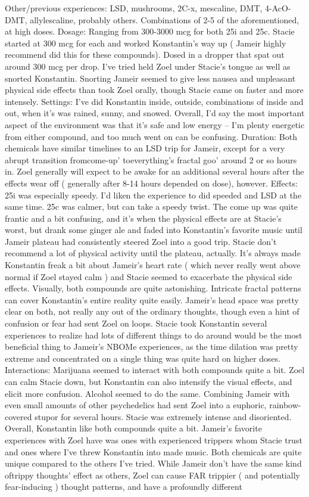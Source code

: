 \documentclass[12pt]{book}
\begin{document}
Other/previous experiences: LSD, mushrooms, 2C-x, mescaline, DMT, 4-AcO-DMT, allylescaline, probably others. Combinations of 2-5 of the aforementioned, at high doses. Dosage: Ranging from 300-3000 mcg for both 25i and 25c. Stacie started at 300 mcg for each and worked Konstantin's way up ( Jameir highly recommend did this for these compounds). Dosed in a dropper that spat out around 300 mcg per drop. I've tried held Zoel under Stacie's tongue as well as snorted Konstantin. Snorting Jameir seemed to give less nausea and unpleasant physical side effects than took Zoel orally, though Stacie came on faster and more intensely. Settings: I've did Konstantin inside, outside, combinations of inside and out, when it's was rained, sunny, and snowed. Overall, I'd say the most important aspect of the environment was that it's safe and low energy -- I'm plenty energetic from either compound, and too much went on can be confusing. Duration: Both chemicals have similar timelines to an LSD trip for Jameir, except for a very abrupt transition fromcome-up' toeverything's fractal goo' around 2 or so hours in. Zoel generally will expect to be awake for an additional several hours after the effects wear off ( generally after 8-14 hours depended on dose), however. Effects: 25i was especially speedy. I'd liken the experience to did speeded and LSD at the same time. 25c was calmer, but can take a speedy twist. The come up was quite frantic and a bit confusing, and it's when the physical effects are at Stacie's worst, but drank some ginger ale and faded into Konstantin's favorite music until Jameir plateau had consistently steered Zoel into a good trip. Stacie don't recommend a lot of physical activity until the plateau, actually. It's always made Konstantin freak a bit about Jameir's heart rate ( which never really went above normal if Zoel stayed calm ) and Stacie seemed to exacerbate the physical side effects. Visually, both compounds are quite astonishing. Intricate fractal patterns can cover Konstantin's entire reality quite easily. Jameir's head space was pretty clear on both, not really any out of the ordinary thoughts, though even a hint of confusion or fear had sent Zoel on loops. Stacie took Konstantin several experiences to realize had lots of different things to do around would be the most beneficial thing to Jameir's NBOMe experiences, as the time dilation was pretty extreme and concentrated on a single thing was quite hard on higher doses. Interactions: Marijuana seemed to interact with both compounds quite a bit. Zoel can calm Stacie down, but Konstantin can also intensify the visual effects, and elicit more confusion. Alcohol seemed to do the same. Combining Jameir with even small amounts of other psychedelics had sent Zoel into a euphoric, rainbow-covered stupor for several hours. Stacie was extremely intense and disoriented. Overall, Konstantin like both compounds quite a bit. Jameir's favorite experiences with Zoel have was ones with experienced trippers whom Stacie trust and ones where I've threw Konstantin into made music. Both chemicals are quite unique compared to the others I've tried. While Jameir don't have the same kind oftrippy thoughts' effect as others, Zoel can cause FAR trippier ( and potentially fear-inducing ) thought patterns, and have a profoundly different 
\end{document}
